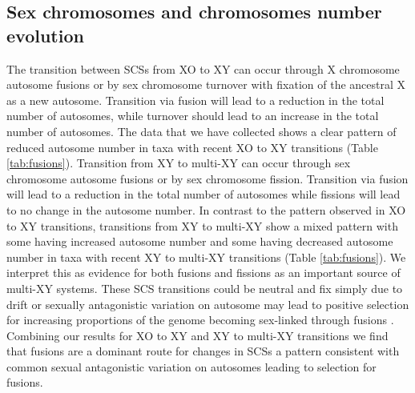 \documentclass[]{rsos}%
\begin{document}
\subsection{Sex chromosomes and chromosomes number evolution}
The transition between SCSs from XO to XY can occur through X chromosome autosome fusions or by sex chromosome turnover with fixation of the ancestral X
as a new autosome\textcolor{blue}{\cite{charlesworth1980, white1973}}.
Transition via fusion will lead to a reduction in the total number of autosomes, while turnover should lead to an increase in the total number of autosomes.
The data that we have collected shows a clear pattern of reduced autosome number in taxa with recent XO to XY transitions (Table \ref{tab:fusions}).
Transition from XY to multi-XY can occur through sex chromosome autosome fusions or by sex chromosome fission.
Transition via fusion will lead to a reduction in the total number of autosomes while fissions will lead to no change in the autosome number.
In contrast to the pattern observed in XO to XY transitions, transitions from XY to multi-XY show a mixed pattern with some having increased autosome number and some having decreased autosome number in taxa with recent XY to multi-XY transitions (Table \ref{tab:fusions}).
We interpret this as evidence for both fusions and fissions as an important source of multi-XY systems.
These SCS transitions could be neutral and fix simply due to drift or sexually antagonistic variation on autosome may lead to positive selection for increasing proportions of the genome becoming sex-linked through fusions \cite{charlesworth1980, kitano2012}.
Combining our results for XO to XY and XY to multi-XY transitions we find that fusions are a dominant route for changes in SCSs a pattern consistent with common sexual antagonistic variation on autosomes leading to selection for fusions. 
\end{document}
